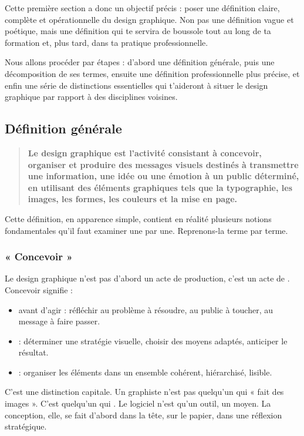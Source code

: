 Cette première section a donc un objectif précis : poser une définition claire, complète et opérationnelle du design graphique. Non pas une définition vague et poétique, mais une définition qui te servira de boussole tout au long de ta formation et, plus tard, dans ta pratique professionnelle.

Nous allons procéder par étapes : d'abord une définition générale, puis une décomposition de ses termes, ensuite une définition professionnelle plus précise, et enfin une série de distinctions essentielles qui t'aideront à situer le design graphique par rapport à des disciplines voisines.

\subsection{Définition générale}

\begin{quote}
\textbf{Le design graphique est l'activité consistant à concevoir, organiser et produire des messages visuels destinés à transmettre une information, une idée ou une émotion à un public déterminé, en utilisant des éléments graphiques tels que la typographie, les images, les formes, les couleurs et la mise en page.}
\end{quote}

Cette définition, en apparence simple, contient en réalité plusieurs notions fondamentales qu'il faut examiner une par une. Reprenons-la terme par terme.

\subsubsection{« Concevoir »}

Le design graphique n'est pas d'abord un acte de production, c'est un acte de . Concevoir signifie :

\begin{itemize}
    \item {} avant d'agir : réfléchir au problème à résoudre, au public à toucher, au message à faire passer.
    \item {} : déterminer une stratégie visuelle, choisir des moyens adaptés, anticiper le résultat.
    \item {} : organiser les éléments dans un ensemble cohérent, hiérarchisé, lisible.
\end{itemize}

C'est une distinction capitale. Un graphiste n'est pas quelqu'un qui « fait des images ». C'est quelqu'un qui . Le logiciel n'est qu'un outil, un moyen. La conception, elle, se fait d'abord dans la tête, sur le papier, dans une réflexion stratégique.

